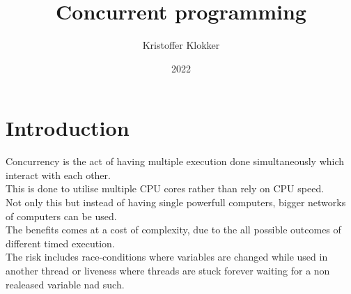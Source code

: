 \documentclass[12pt, a4paper]{article}
\title{Concurrent programming}
\date{2022}
\author{Kristoffer Klokker}
\begin{document}
	\maketitle
	\clearpage
	\tableofcontents
	\clearpage
	\section{Introduction}
		Concurrency is the act of having multiple execution done simultaneously which interact with each other.\\
		This is done to utilise multiple CPU cores rather than rely on CPU speed.\\
		Not only this but instead of having single powerfull computers, bigger networks of computers can be used.\\
		The benefits comes at a cost of complexity, due to the all possible outcomes of different timed execution.\\
		The risk includes race-conditions where variables are changed while used in another thread or liveness where threads are stuck forever waiting for a non realeased variable nad such.
\end{document}
